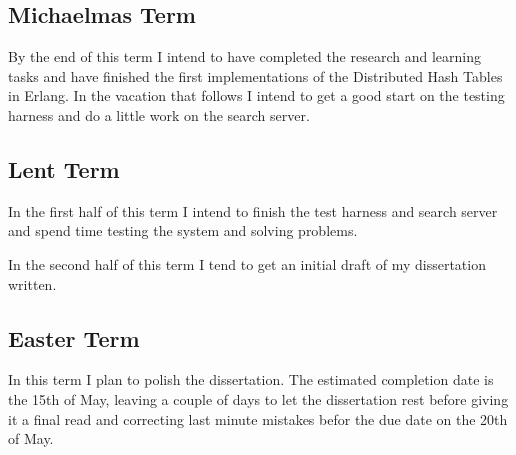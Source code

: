 \subsection*{Michaelmas Term} 

By the end of this term I intend to have completed the research and learning tasks and have finished the first implementations of the Distributed Hash Tables in Erlang. In the vacation that follows I intend to get a good start on the testing harness and do a little work on the search server.


\subsection*{Lent Term}

In the first half of this term I intend to finish the test harness and search server and spend time testing the system and solving problems.

In the second half of this term I tend to get an initial draft of my dissertation written.


\subsection*{Easter Term}

In this term I plan to polish the dissertation. The estimated completion date is the 15th of May, leaving a couple of days to let the dissertation rest before giving it a final read and correcting last minute mistakes befor the due date on the 20th of May.
